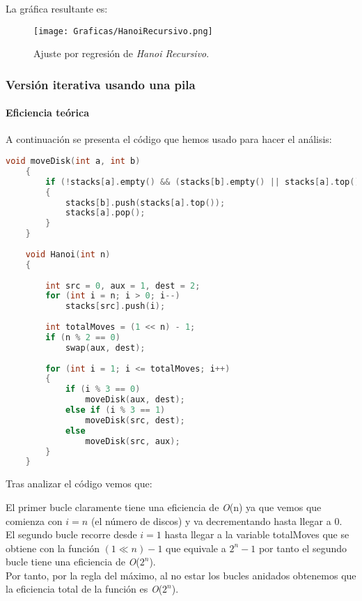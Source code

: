 \documentclass[a4paper,12pt]{article} %
\begin{document}
La gráfica resultante es:
\begin{figure}[H]
	\centering
	\texttt{[image: Graficas/HanoiRecursivo.png]}
	\caption{Ajuste por regresión de \textit{Hanoi Recursivo}.}
\end{figure}


\subsubsection{Versión iterativa usando una pila}

\paragraph{Eficiencia teórica}

A continuación se presenta el código que hemos usado para hacer el análisis:

\begin{lstlisting}[language=C, caption={Código de Hanoi Iterativo con pila}]
	void moveDisk(int a, int b)
	{
		if (!stacks[a].empty() && (stacks[b].empty() || stacks[a].top() < stacks[b].top()))
		{
			stacks[b].push(stacks[a].top());
			stacks[a].pop();
		}
	}
	 
	void Hanoi(int n)
	{
	 
		int src = 0, aux = 1, dest = 2;
		for (int i = n; i > 0; i--)
			stacks[src].push(i);
	 
		int totalMoves = (1 << n) - 1;
		if (n % 2 == 0)
			swap(aux, dest);
	 
		for (int i = 1; i <= totalMoves; i++)
		{
			if (i % 3 == 0)
				moveDisk(aux, dest);
			else if (i % 3 == 1)
				moveDisk(src, dest);
			else
				moveDisk(src, aux);
		}
	}
\end{lstlisting}

Tras analizar el código vemos que:

El primer bucle claramente tiene una eficiencia de \textit{O}(n) ya que vemos que comienza con $i=n$ (el número de discos)
y va decrementando hasta llegar a 0.\\

El segundo bucle recorre desde $i=1$ hasta llegar a la variable totalMoves que se obtiene con la función
$(1 \ll n) - 1$ que equivale a $2^n - 1$ por tanto el segundo bucle tiene una eficiencia de \textit{O}($2^n$).\\

Por tanto, por la regla del máximo, al no estar los bucles anidados obtenemos que la eficiencia total de la función es \textit{O}($2^n$).\\
\end{document}
